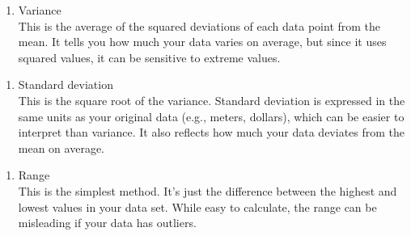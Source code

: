 \documentclass[
]{book}
\newenvironment{Shaded}{\begin{snugshade}}{\end{snugshade}}
\newcommand{\AttributeTok}[1]{\textcolor[rgb]{0.13,0.29,0.53}{#1}}
\newcommand{\CommentTok}[1]{\textcolor[rgb]{0.56,0.35,0.01}{\textit{#1}}}
\newcommand{\FunctionTok}[1]{\textcolor[rgb]{0.13,0.29,0.53}{\textbf{#1}}}
\newcommand{\NormalTok}[1]{#1}
\newcommand{\SpecialCharTok}[1]{\textcolor[rgb]{0.81,0.36,0.00}{\textbf{#1}}}
\newcommand{\StringTok}[1]{\textcolor[rgb]{0.31,0.60,0.02}{#1}}
\providecommand{\tightlist}{%
  \setlength{\itemsep}{0pt}\setlength{\parskip}{0pt}}
\begin{document}
\begin{enumerate}
\def\labelenumi{\arabic{enumi}.}
\tightlist
\item
  Variance\\
  This is the average of the squared deviations of each data point from the mean. It tells you how much your data varies on average, but since it uses squared values, it can be sensitive to extreme values.
\end{enumerate}

\begin{Shaded}
\end{Shaded}

\begin{enumerate}
\def\labelenumi{\arabic{enumi}.}
\setcounter{enumi}{1}
\tightlist
\item
  Standard deviation\\
  This is the square root of the variance. Standard deviation is expressed in the same units as your original data (e.g., meters, dollars), which can be easier to interpret than variance. It also reflects how much your data deviates from the mean on average.
\end{enumerate}

\begin{Shaded}
\end{Shaded}

\begin{enumerate}
\def\labelenumi{\arabic{enumi}.}
\setcounter{enumi}{2}
\tightlist
\item
  Range\\
  This is the simplest method. It's just the difference between the highest and lowest values in your data set. While easy to calculate, the range can be misleading if your data has outliers.
\end{enumerate}
\end{document}
